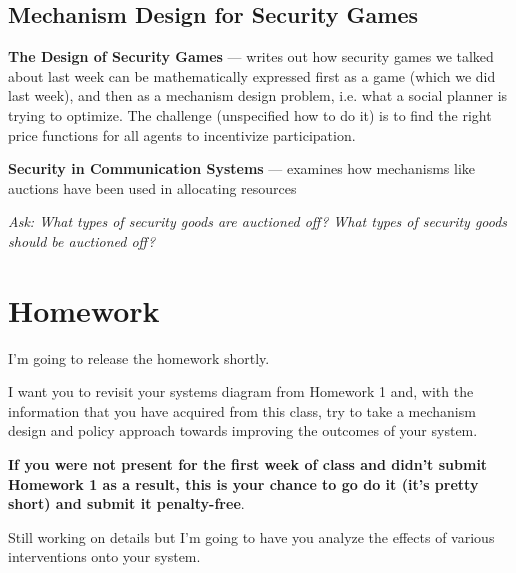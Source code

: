 \documentclass[11pt]{article}
\begin{document}
\subsection{Mechanism Design for Security Games}

{\bf The Design of Security Games} --- writes out how security games we talked about last week can be mathematically expressed first as a game (which we did last week), and then as a mechanism design problem, i.e. what a social planner is trying to optimize. The challenge (unspecified how to do it) is to find the right price functions for all agents to incentivize participation.

{\bf Security in Communication Systems} --- examines how mechanisms like auctions have been used in allocating resources 

{\it Ask: What types of security goods are auctioned off? What types of security goods should be auctioned off?}

\section{Homework}

I'm going to release the homework shortly.

I want you to revisit your systems diagram from Homework 1 and, with the information that you have acquired from this class, try to take a mechanism design and policy approach towards improving the outcomes of your system. 

{\bf If you were not present for the first week of class and didn't submit Homework 1 as a result, this is your chance to go do it (it's pretty short) and submit it penalty-free}.

Still working on details but I'm going to have you analyze the effects of various interventions onto your system. 
\end{document}
